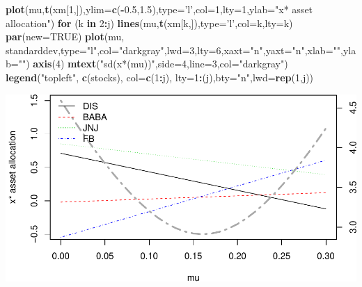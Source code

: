 \documentclass[]{article}
\newenvironment{Shaded}{\begin{snugshade}}{\end{snugshade}}
\newcommand{\KeywordTok}[1]{\textcolor[rgb]{0.13,0.29,0.53}{\textbf{#1}}}
\newcommand{\DataTypeTok}[1]{\textcolor[rgb]{0.13,0.29,0.53}{#1}}
\newcommand{\DecValTok}[1]{\textcolor[rgb]{0.00,0.00,0.81}{#1}}
\newcommand{\FloatTok}[1]{\textcolor[rgb]{0.00,0.00,0.81}{#1}}
\newcommand{\StringTok}[1]{\textcolor[rgb]{0.31,0.60,0.02}{#1}}
\newcommand{\OtherTok}[1]{\textcolor[rgb]{0.56,0.35,0.01}{#1}}
\newcommand{\ControlFlowTok}[1]{\textcolor[rgb]{0.13,0.29,0.53}{\textbf{#1}}}
\newcommand{\OperatorTok}[1]{\textcolor[rgb]{0.81,0.36,0.00}{\textbf{#1}}}
\newcommand{\NormalTok}[1]{#1}
\begin{document}
\begin{Shaded}
\begin{Highlighting}[]
\KeywordTok{plot}\NormalTok{(mu,}\KeywordTok{t}\NormalTok{(xm[}\DecValTok{1}\NormalTok{,]),}\DataTypeTok{ylim=}\KeywordTok{c}\NormalTok{(}\OperatorTok{-}\FloatTok{0.5}\NormalTok{,}\FloatTok{1.5}\NormalTok{),}\DataTypeTok{type=}\StringTok{'l'}\NormalTok{,}\DataTypeTok{col=}\DecValTok{1}\NormalTok{,}\DataTypeTok{lty=}\DecValTok{1}\NormalTok{,}\DataTypeTok{ylab=}\StringTok{"x* asset allocation"}\NormalTok{)}
\ControlFlowTok{for}\NormalTok{ (k }\ControlFlowTok{in} \DecValTok{2}\OperatorTok{:}\NormalTok{j) }\KeywordTok{lines}\NormalTok{(mu,}\KeywordTok{t}\NormalTok{(xm[k,]),}\DataTypeTok{type=}\StringTok{'l'}\NormalTok{,}\DataTypeTok{col=}\NormalTok{k,}\DataTypeTok{lty=}\NormalTok{k)}
\KeywordTok{par}\NormalTok{(}\DataTypeTok{new=}\OtherTok{TRUE}\NormalTok{)}
\KeywordTok{plot}\NormalTok{(mu, standarddev,}\DataTypeTok{type=}\StringTok{"l"}\NormalTok{,}\DataTypeTok{col=}\StringTok{"darkgray"}\NormalTok{,}\DataTypeTok{lwd=}\DecValTok{3}\NormalTok{,}\DataTypeTok{lty=}\DecValTok{6}\NormalTok{,}\DataTypeTok{xaxt=}\StringTok{"n"}\NormalTok{,}\DataTypeTok{yaxt=}\StringTok{"n"}\NormalTok{,}\DataTypeTok{xlab=}\StringTok{""}\NormalTok{,}\DataTypeTok{ylab=}\StringTok{""}\NormalTok{)}
\KeywordTok{axis}\NormalTok{(}\DecValTok{4}\NormalTok{)}
\KeywordTok{mtext}\NormalTok{(}\StringTok{"sd(x*(mu))"}\NormalTok{,}\DataTypeTok{side=}\DecValTok{4}\NormalTok{,}\DataTypeTok{line=}\DecValTok{3}\NormalTok{,}\DataTypeTok{col=}\StringTok{"darkgray"}\NormalTok{)}
\KeywordTok{legend}\NormalTok{(}\StringTok{"topleft"}\NormalTok{, }\KeywordTok{c}\NormalTok{(stocks), }\DataTypeTok{col=}\KeywordTok{c}\NormalTok{(}\DecValTok{1}\OperatorTok{:}\NormalTok{j), }\DataTypeTok{lty=}\DecValTok{1}\OperatorTok{:}\NormalTok{(j),}\DataTypeTok{bty=}\StringTok{"n"}\NormalTok{,}\DataTypeTok{lwd=}\KeywordTok{rep}\NormalTok{(}\DecValTok{1}\NormalTok{,j))}
\end{Highlighting}
\end{Shaded}

\includegraphics{Markowitz_Research_Me_files/figure-latex/unnamed-chunk-17-1.pdf}
\end{document}
